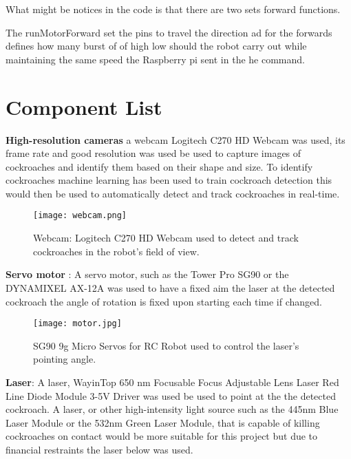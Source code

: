 \documentclass[11pt]{article}
\begin{document}
What might be notices in the code is that there are two sets forward functions.  

The runMotorForward set the pins to travel the direction ad for the forwards defines how many burst of of high low should the robot carry out while maintaining the same speed the Raspberry pi sent in the he command.

	\section{Component List}
	
	
	
	\textbf{High-resolution cameras} a webcam Logitech C270 HD Webcam was used, its frame rate and good resolution was used be used to capture images of cockroaches and identify them based on their shape and size. To identify cockroaches machine learning has been used to train cockroach detection this would then be used to automatically detect and track cockroaches in real-time.
	
	
	
	\begin{center}
		
		
		\begin{figure}[H]
			\centering
			\texttt{[image: webcam.png]}
			\caption{Webcam:  Logitech C270 HD Webcam used to detect and track cockroaches in the robot's field of view.}  
			\label{fig:Flowchart}
		\end{figure}
	\end{center}
	
	
	
	
	\textbf{Servo motor }: A servo motor, such as the Tower Pro SG90 or the DYNAMIXEL AX-12A was  used to have a fixed aim the laser at the detected cockroach the angle of rotation is fixed upon starting each time if changed.
	\begin{center}
		
		
		\begin{figure}[H]
			\centering
			\texttt{[image: motor.jpg]}
			\caption{SG90 9g Micro Servos for RC Robot used to control the laser's pointing angle.}  
			\label{fig:Flowchart}
		\end{figure}
	\end{center}
	
	
	
	\textbf{Laser}: A laser, WayinTop 650 nm Focusable Focus Adjustable Lens Laser Red Line Diode Module 3-5V Driver was used be used to point at the  the detected cockroach. A laser, or other high-intensity light source such as the 445nm Blue Laser Module or the 532nm Green Laser Module, that is capable of killing cockroaches on contact would be more suitable for this project but due to financial restraints the laser below was used.
	
\end{document}
